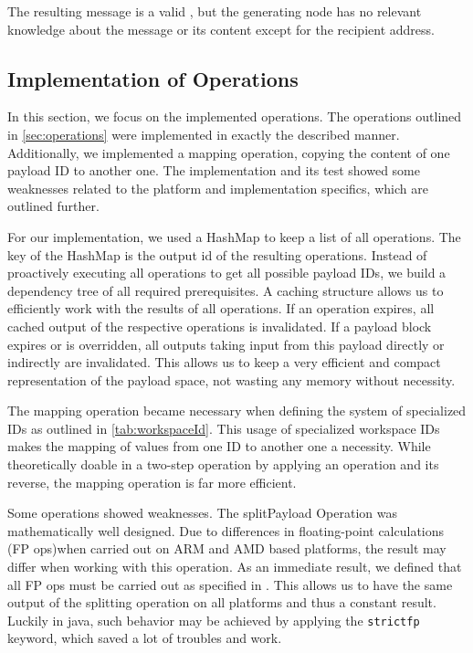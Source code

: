 The resulting message is a valid \VortexMessage, but the generating node has no relevant knowledge about the message or its content except for the recipient address.

\subsection{Implementation of Operations\label{sec:implOperations}}
In this section, we focus on the implemented operations. The operations outlined in \cref{sec:operations} were implemented in exactly the described manner. Additionally, we implemented a mapping operation, copying the content of one payload ID to another one. The implementation and its test showed some weaknesses related to the platform and implementation specifics, which are outlined further.

For our implementation, we used a HashMap to keep a list of all operations. The key of the HashMap is the output id of the resulting operations. Instead of proactively executing all operations to get all possible payload IDs, we build a dependency tree of all required prerequisites. A caching structure allows us to efficiently work with the results of all operations. If an operation expires, all cached output of the respective operations is invalidated. If a payload block expires or is overridden, all outputs taking input from this payload directly or indirectly are invalidated. This allows us to keep a very efficient and compact representation of the payload space, not wasting any memory without necessity.

The mapping operation became necessary when defining the system of specialized IDs as outlined in \cref{tab:workspaceId}. This usage of specialized workspace IDs makes the mapping of values from one  ID to another one a necessity. While theoretically doable in a two-step operation by applying an operation and its reverse, the mapping operation is far more efficient.

Some operations showed weaknesses. The splitPayload Operation was mathematically well designed. Due to differences in floating-point calculations (FP ops)when carried out on ARM and AMD based platforms, the result may differ when working with this operation. As an immediate result, we defined that all FP ops must be carried out as specified in \cite{IEEE754}. This allows us to have the same output of the splitting operation on all platforms and thus a constant result. Luckily in java, such behavior may be achieved by applying the \lstinline[columns=fixed,basicstyle={\normalsize}]{strictfp} keyword, which saved a lot of troubles and work.

